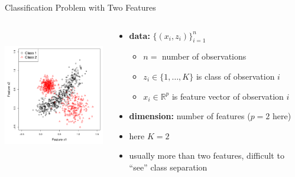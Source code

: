 \documentclass[12pt]{beamer}
\begin{document}
\begin{frame}{Classification Problem with Two Features}
\begin{columns}[T] %

\begin{column}{.5\textwidth}
\includegraphics[height=2.3in,width=2.3in]{figs/training.pdf}
\end{column}
\begin{column}{.5\textwidth}
  \begin{itemize}
  \item \textbf{data:} $\{(x_i,z_i)\}_{i=1}^n$
    \begin{itemize}
    \item $n = $ number of observations
    \item $z_i \in \{1,\ldots,K\}$ is class of observation $i$
    \item $x_i \in \mathbb{R}^p$ is feature vector of observation $i$
    \end{itemize}
  \item \textbf{dimension:} number of features ($p=2$ here)
  \item here $K=2$
  \item usually more than two features, difficult to ``see'' class separation
  \end{itemize}
\end{column}

\end{columns}

\end{frame}
\end{document}
